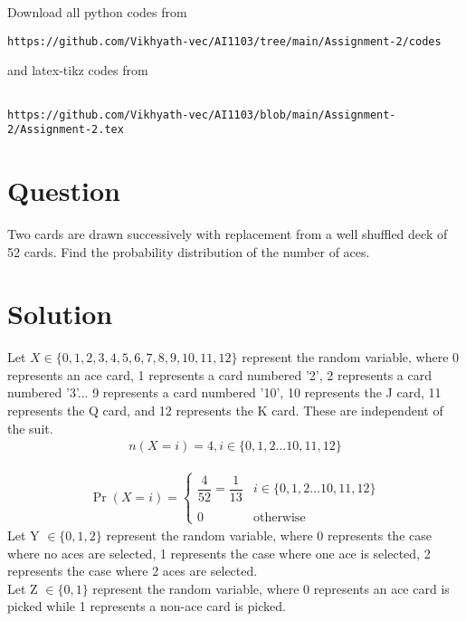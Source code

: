 \documentclass[journal,12pt,twocolumn]{IEEEtran}
\begin{document}
\maketitle
\newpage
\bigskip
\renewcommand{\thefigure}{\theenumi}
\renewcommand{\thetable}{\theenumi}
Download all python codes from 
\begin{lstlisting}
https://github.com/Vikhyath-vec/AI1103/tree/main/Assignment-2/codes
\end{lstlisting}
%
and latex-tikz codes from 
%
\begin{lstlisting}

https://github.com/Vikhyath-vec/AI1103/blob/main/Assignment-2/Assignment-2.tex
\end{lstlisting}
\section*{Question}
Two cards are drawn successively with replacement from a well shuffled deck of 52 cards. Find the probability distribution of the number of aces.

\section*{Solution}

Let $X \in \{0,1,2,3,4,5,6,7,8,9,10,11,12\}$ represent the random variable, where 0 represents an ace card, 1 represents a card numbered '2', 2 represents a card numbered '3'... 9 represents a card numbered '10', 10 represents the J card, 11 represents the Q card, and 12 represents the K card. These are independent of the suit. 
\begin{align}
    n(X=i) = 4, i \in \{0, 1, 2\hdots 10, 11, 12\}
\end{align}

\begin{align}
    \Pr(X=i) = 
	\begin{cases}
	\dfrac{4}{52} = \dfrac{1}{13} &  i \in \{0, 1, 2\hdots 10, 11, 12\}\\ ~\\[-1em]
	0 & \text{otherwise}
	\end{cases}
\end{align}
Let Y $\in \{0,1,2\}$ represent the random variable, where 0 represents the case where no aces are selected, 1 represents the case where one ace is selected, 2 represents the case where 2 aces are selected.
\\Let Z $\in \{0,1\}$ represent the random variable, where 0 represents an ace card is picked while 1 represents a non-ace card is picked.
\end{document}
